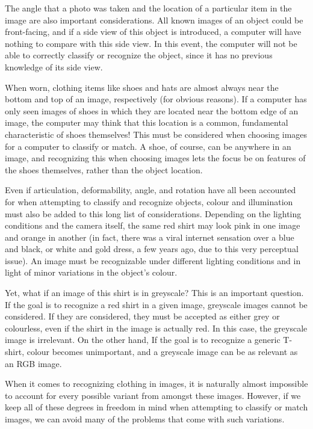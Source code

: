 \documentclass[12pt]{report} %
\begin{document}
	The angle that a photo was taken and the location of a particular item in the image are also important considerations. All known images of an object could be front-facing, and if a side view of this object is introduced, a computer will have nothing to compare with this side view. In this event, the computer will not be able to correctly classify or recognize the object, since it has no previous knowledge of its side view. 

	When worn, clothing items like shoes and hats are almost always near the bottom and top of an image, respectively (for obvious reasons). If a computer has only seen images of shoes in which they are located near the bottom edge of an image, the computer may think that this location is a common, fundamental characteristic of shoes themselves! This must be considered when choosing images for a computer to classify or match. A shoe, of course, can be anywhere in an image, and recognizing this when choosing images lets the focus be on features of the shoes themselves, rather than the object location. 
	
	Even if articulation, deformability, angle, and rotation have all been accounted for when attempting to classify and recognize objects, colour and illumination must also be added to this long list of considerations. Depending on the lighting conditions and the camera itself, the same red shirt may look pink in one image and orange in another (in fact, there was a viral internet sensation over a blue and black, or white and gold dress, a few years ago, due to this very perceptual issue). An image must be recognizable under different lighting conditions and in light of minor variations in the object's colour. 

	Yet, what if an image of this shirt is in greyscale? This is an important question. If the goal is to recognize a red shirt in a given image, greyscale images cannot be considered. If they are considered, they must be accepted as either grey or colourless, even if the shirt in the image is actually red. In this case, the greyscale image is irrelevant. On the other hand, If the goal is to recognize a generic T-shirt, colour becomes unimportant, and a greyscale image can be as relevant as an RGB image.
	
	When it comes to recognizing clothing in images, it is naturally almost impossible to account for every possible variant from amongst these images. However, if we keep all of these degrees in freedom in mind when attempting to classify or match images, we can avoid many of the problems that come with such variations. 
		
\end{document}
